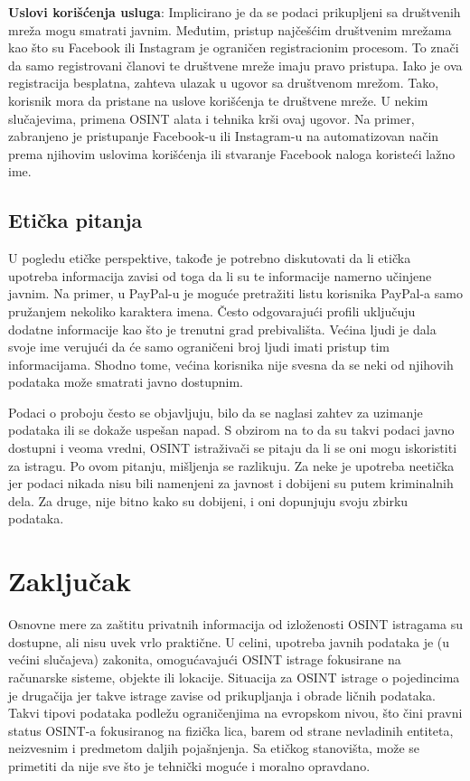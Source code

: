 \documentclass[a4paper, 11pt]{article}
\begin{document}
\textbf{Uslovi korišćenja usluga}: Implicirano je da se podaci prikupljeni sa društvenih mreža mogu smatrati javnim. Međutim, pristup najčešćim društvenim mrežama kao što su Facebook ili Instagram je ograničen registracionim procesom. To znači da samo registrovani članovi te društvene mreže imaju pravo pristupa. Iako je ova registracija besplatna, zahteva ulazak u ugovor sa društvenom mrežom. Tako, korisnik mora da pristane na uslove korišćenja te društvene mreže. U nekim slučajevima, primena OSINT alata i tehnika krši ovaj ugovor. Na primer, zabranjeno je pristupanje Facebook-u ili Instagram-u na automatizovan način prema njihovim uslovima korišćenja ili stvaranje Facebook naloga koristeći lažno ime.
\subsection{Etička pitanja}
U pogledu etičke perspektive, takođe je potrebno diskutovati da li etička upotreba informacija zavisi od toga da li su te informacije namerno učinjene javnim. Na primer, u PayPal-u je moguće pretražiti listu korisnika PayPal-a samo pružanjem nekoliko karaktera imena. Često odgovarajući profili uključuju dodatne informacije kao što je trenutni grad prebivališta. Većina ljudi je dala svoje ime verujući da će samo ograničeni broj ljudi imati pristup tim informacijama. Shodno tome, većina korisnika nije svesna da se neki od njihovih podataka može smatrati javno dostupnim.\newline

Podaci o proboju često se objavljuju, bilo da se naglasi zahtev za uzimanje podataka ili se dokaže uspešan napad. S obzirom na to da su takvi podaci javno dostupni i veoma vredni, OSINT istraživači se pitaju da li se oni mogu iskoristiti za istragu. Po ovom pitanju, mišljenja se razlikuju. Za neke je upotreba neetička jer podaci nikada nisu bili namenjeni za javnost i dobijeni su putem kriminalnih dela. Za druge, nije bitno kako su dobijeni, i oni dopunjuju svoju zbirku podataka.\newpage
\section{Zaključak}
Osnovne mere za zaštitu privatnih informacija od izloženosti OSINT istragama su dostupne, ali nisu uvek vrlo praktične. U celini, upotreba javnih podataka je (u većini slučajeva) zakonita, omogućavajući OSINT istrage fokusirane na računarske sisteme, objekte ili lokacije. Situacija za OSINT istrage o pojedincima je drugačija jer takve istrage zavise od prikupljanja i obrade ličnih podataka. Takvi tipovi podataka podležu ograničenjima na evropskom nivou, što čini pravni status OSINT-a fokusiranog na fizička lica, barem od strane nevladinih entiteta, neizvesnim i predmetom daljih pojašnjenja. Sa etičkog stanovišta, može se primetiti da nije sve što je tehnički moguće i moralno opravdano.
\newpage
\end{document}
